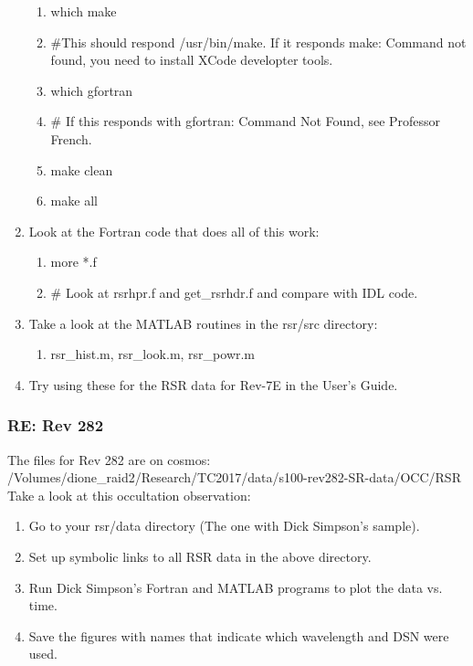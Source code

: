 \documentclass[crop=false,class=book]{standalone}
\begin{document}
\begin{enumerate}
\begin{enumerate}
        \item[] which make
        \item[] \#This should respond /usr/bin/make. If it responds make: Command not found, you need to install XCode developter tools.
        \item[] which gfortran
        \item[] \# If this responds with gfortran: Command Not Found, see Professor French.
        \item[] make clean
        \item[] make all
    \end{enumerate}
    \item Look at the Fortran code that does all of this work:
    \begin{enumerate}
        \item[] more *.f
        \item[] \# Look at rsrhpr.f and get\_rsrhdr.f and compare with IDL code.
    \end{enumerate}
    \item Take a look at the MATLAB routines in the rsr/src directory:
    \begin{enumerate}
        \item[] rsr\_hist.m, rsr\_look.m, rsr\_powr.m
    \end{enumerate}
    \item Try using these for the RSR data for Rev-7E in the User's Guide.
\end{enumerate}
\subsubsection{\footnotesize RE: Rev 282}
The files for Rev 282 are on cosmos: /Volumes/dione\_raid2/Research/TC2017/data/s100-rev282-SR-data/OCC/RSR\\
Take a look at this occultation observation:
\begin{enumerate}
    \item Go to your rsr/data directory (The one with Dick Simpson's sample).
    \item Set up symbolic links to all RSR data in the above directory.
    \item Run Dick Simpson's Fortran and MATLAB programs to plot the data vs. time.
    \item Save the figures with names that indicate which wavelength and DSN were used.
\end{enumerate}
\end{document}
